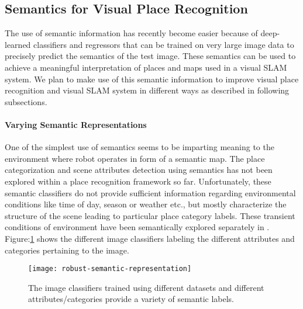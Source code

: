 \documentclass{article}
\begin{document}
\subsection{Semantics for Visual Place Recognition}
The use of semantic information has recently become easier because of deep-learned classifiers and regressors \cite{girshick2014rich,zhou2014learning} that can be trained on very large image data to precisely predict the semantics of the test image. These semantics can be used to achieve a meaningful interpretation of places and maps used in a visual SLAM system. We plan to make use of this semantic information to improve visual place recognition and visual SLAM system in different ways as described in following subsections.

\paragraph{Varying Semantic Representations}
One of the simplest use of semantics seems to be imparting meaning to the environment where robot operates in form of a semantic map. The place categorization \cite{zhou2014learning} and scene attributes detection \cite{Patterson2012SunAttributes} using semantics has not been explored within a place recognition framework so far. Unfortunately, these semantic classifiers do not provide sufficient information regarding environmental conditions like time of day, season or weather etc., but mostly characterize the structure of the scene leading to particular place category labels. These transient conditions of environment have been semantically explored separately in \cite{laffont2014transient}. Figure:\ref{fig:robustSemRep} shows the different image classifiers labeling the different attributes and categories pertaining to the image.

\begin{figure}[htbp]
 \centering
 \texttt{[image: robust-semantic-representation]}
 \caption{The image classifiers trained using different datasets and different attributes/categories provide a variety of semantic labels.}
 \label{fig:robustSemRep}
\end{figure}
\end{document}
